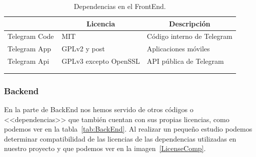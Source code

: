 \begin{longtable}[c]{@{}lll@{}}
\toprule
\centering
\multicolumn{1}{c}{\textbf{Nombre}} & \multicolumn{1}{c}{\textbf{Licencia}} & \multicolumn{1}{c}{\textbf{Descripción}} \\ \midrule
\endfirsthead
%
\endhead
%
\bottomrule
\endfoot
%
\endlastfoot
%
Telegram Code & MIT & Código interno de Telegram \\
Telegram App~\cite{misc:TelegramApp} & GPLv2 y post & Aplicaciones móviles \\
Telegram Api~\cite{misc:TelegramApi} & GPLv3 excepto OpenSSL & API pública de Telegram \\ \bottomrule \\
\caption{Dependencias en el FrontEnd.}
\label{tab:FrontEnd}
\end{longtable}

\subsubsection{Backend}
En la parte de BackEnd nos hemos servido de otros códigos o <<dependencias>> que también cuentan con sus propias licencias, como podemos ver en la tabla~\ref{tab:BackEnd}. Al realizar un pequeño estudio podemos determinar compatibilidad de las licencias de las dependencias utilizadas en nuestro proyecto y que podemos ver en la imagen~\ref{LicenseComp}.~\\~\\ %


